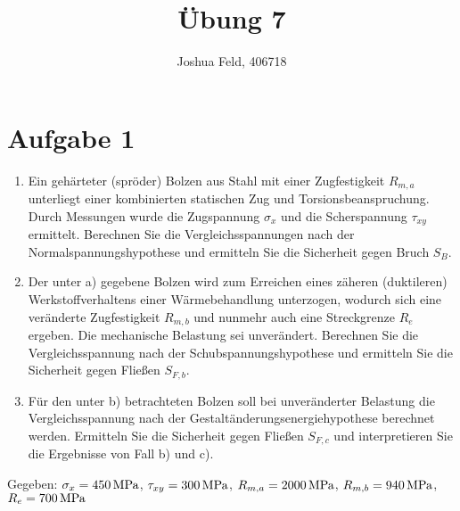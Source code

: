 \documentclass{exercise}
\institute{Lehr- und Forschungsgebiet Kontinuumsmechanik}
\title{Übung 7}
\author{Joshua Feld, 406718}
\begin{document}
    \maketitle

    
    \section*{Aufgabe 1}

    \begin{problem}
        \begin{enumerate}
            \item Ein gehärteter (spröder) Bolzen aus Stahl mit einer Zugfestigkeit \(R_{m, a}\) unterliegt einer kombinierten statischen Zug und Torsionsbeanspruchung.
            Durch Messungen wurde die Zugspannung \(\sigma_x\) und die Scherspannung \(\tau_{xy}\) ermittelt.
            Berechnen Sie die Vergleichsspannungen nach der Normalspannungshypothese und ermitteln Sie die Sicherheit gegen Bruch \(S_B\).
            \item Der unter a) gegebene Bolzen wird zum Erreichen eines zäheren (duktileren) Werkstoffverhaltens einer Wärmebehandlung unterzogen, wodurch sich eine veränderte Zugfestigkeit \(R_{m, b}\) und nunmehr auch eine Streckgrenze \(R_e\) ergeben.
            Die mechanische Belastung sei unverändert.
            Berechnen Sie die Vergleichsspannung nach der Schubspannungshypothese und ermitteln Sie die Sicherheit gegen Fließen \(S_{F, b}\).
            \item Für den unter b) betrachteten Bolzen soll bei unveränderter Belastung die Vergleichsspannung nach der Gestaltänderungsenergiehypothese berechnet werden.
            Ermitteln Sie die Sicherheit gegen Fließen \(S_{F, c}\) und interpretieren Sie die Ergebnisse von Fall b) und c).
        \end{enumerate}
        Gegeben: \(\sigma_x = 450\,\si{\mega\pascal}\), \(\tau_{xy} = 300\,\si{\mega\pascal}\), \(R_{m, a} = 2000\,\si{\mega\pascal}\), \(R_{m, b} = 940\,\si{\mega\pascal}\), \(R_e = 700\,\si{\mega\pascal}\)
    \end{problem}
\end{document}
